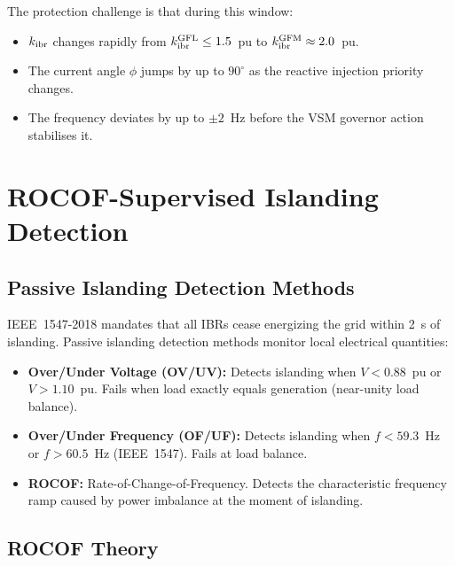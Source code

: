 The protection challenge is that during this window:
\begin{itemize}
\item $k_\mathrm{ibr}$ changes rapidly from $k_\mathrm{ibr}^\mathrm{GFL} \leq 1.5$~pu
      to $k_\mathrm{ibr}^\mathrm{GFM} \approx 2.0$~pu.
\item The current angle $\phi$ jumps by up to $90^\circ$ as the reactive
      injection priority changes.
\item The frequency deviates by up to $\pm 2$~Hz before the VSM
      governor action stabilises it.
\end{itemize}

\section{ROCOF-Supervised Islanding Detection}
\label{sec:ch5_islanding}

\subsection{Passive Islanding Detection Methods}

IEEE~1547-2018 mandates that all IBRs cease energizing the grid within
2~s of islanding. Passive islanding detection methods monitor local
electrical quantities:
\begin{itemize}
\item \textbf{Over/Under Voltage (OV/UV):} Detects islanding when
      $V < 0.88$~pu or $V > 1.10$~pu. Fails when load exactly equals
      generation (near-unity load balance).
\item \textbf{Over/Under Frequency (OF/UF):} Detects islanding when
      $f < 59.3$~Hz or $f > 60.5$~Hz (IEEE~1547). Fails at load balance.
\item \textbf{ROCOF:} Rate-of-Change-of-Frequency. Detects the
      characteristic frequency ramp caused by power imbalance at the
      moment of islanding.
\end{itemize}

\subsection{ROCOF Theory}

